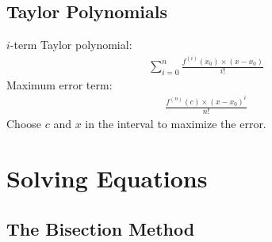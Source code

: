 \documentclass[12pt]{article}
\begin{document}
\subsection*{Taylor Polynomials}
$i$-term Taylor polynomial:
\begin{align*}
    \sum_{i=0}^n \frac{f^{(i)}(x_0) \times (x - x_0)}{i!}
\end{align*}
Maximum error term:
\begin{align*}
    \frac{f^{(n)}(c) \times (x - x_0)^i}{n!}
\end{align*}
Choose $c$ and $x$ in the interval to maximize the error.

\section*{Solving Equations}

\subsection*{The Bisection Method}
\end{document}
